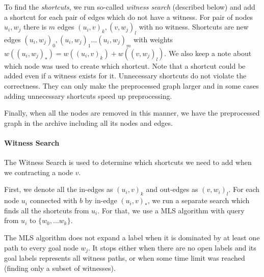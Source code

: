 To find the {\em shortcuts}, we run so-called {\em witness search} (described
below) and add a shortcut for each pair of edges which do not have a witness.
For pair of nodes $u_i, w_j$ there is $m$ edges $(u_i,v)_k,(v,w_j)_l$
with no witness. Shortcuts are new edges
$(u_i,w_j)_0, (u_i,w_j)_1 \dots (u_i,w_j)_m$ 
with weights $w((u_i,w_j)_*) = w((u_i,v)_k)+w((v,w_j)_l)$.  We also keep a note
about which node was used to create which shortcut.  Note that a shortcut could
be added even if a witness exists for it. Unnecessary shortcuts do not violate
the correctness. They can only make the preprocessed graph larger and in some
cases adding unnecessary shortcuts speed up preprocessing. 


Finally, when all the nodes are removed in this manner, we have the
preprocessed graph in the archive including all its nodes and edges.

\paragraph*{Witness Search} The Witness Search is used to determine which
shortcuts we need to add when we contracting a node $v$. 

First, we denote all the in-edges as $(u_i,v)_k$ and out-edges as $(v,w_i)_l$.
For each node $u_i$ connected with $b$ by in-edge $(u_i,v)_*$, we run a
separate search which finds all the shortcuts from $u_i$. For that, we use a
MLS algorithm with query from $u_i$ to $\{w_0,\dots w_k\}$. 

The MLS algorithm does not expand a label when it is dominated by at least one
path to every goal node $w_j$. It stops either when there are no open labels
and its goal labels represents all witness paths, or when some time limit was reached
(finding only a subset of witnesses). 


